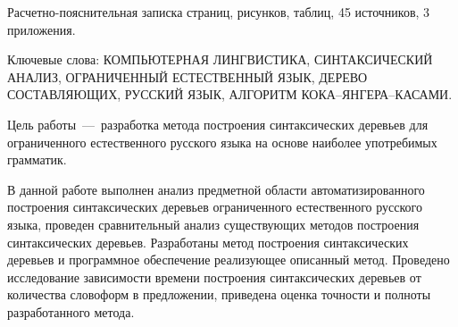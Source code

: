 
Расчетно-пояснительная записка \pageref{LastPage} страниц, \totalfigures{} рисунков, \totaltables{} таблиц, 45 источников, 3 приложения.

Ключевые слова: КОМПЬЮТЕРНАЯ ЛИНГВИСТИКА, СИНТАКСИЧЕСКИЙ АНАЛИЗ, ОГРАНИЧЕННЫЙ ЕСТЕСТВЕННЫЙ ЯЗЫК, ДЕРЕВО СОСТАВЛЯЮЩИХ, РУССКИЙ ЯЗЫК, АЛГОРИТМ КОКА–ЯНГЕРА–КАСАМИ.

Цель работы~---~разработка метода построения синтаксических деревьев для ограниченного естественного русского языка на основе наиболее употребимых грамматик.


В данной работе выполнен анализ предметной области автоматизированного построения синтаксических деревьев ограниченного естественного русского языка, проведен сравнительный анализ существующих методов построения синтаксических деревьев. Разработаны метод построения синтаксических деревьев и программное обеспечение реализующее описанный метод. Проведено исследование зависимости времени построения синтаксических деревьев от количества словоформ в предложении, приведена оценка точности и полноты разработанного метода.